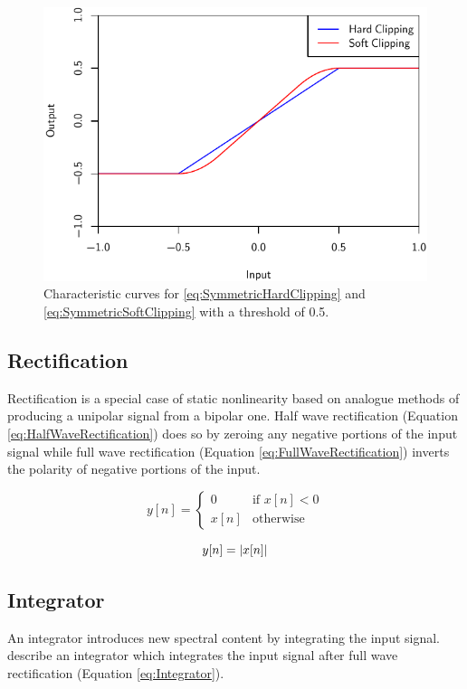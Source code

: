 		\begin{figure}[h!]
			\centering
			\includegraphics{chapter3/Images/Clipping.pdf}
			\caption{Characteristic curves for \ref{eq:SymmetricHardClipping} and
				 \ref{eq:SymmetricSoftClipping} with a threshold of 0.5.}
			\label{fig:Clipping}
		\end{figure}

	\subsection{Rectification}
	\label{sec:Excitation-Methods-Rectification}
		Rectification is a special case of static nonlinearity based on analogue methods of producing a unipolar
		signal from a bipolar one. Half wave rectification (Equation \ref{eq:HalfWaveRectification}) does so by
		zeroing any negative portions of the input signal while full wave rectification (Equation
		\ref{eq:FullWaveRectification}) inverts the polarity of negative portions of the input.

		\begin{equation}
			y[n] = \begin{cases}
				0 & \text{if $x[n] < 0$} \\
				x[n] & \text{otherwise}
			\end{cases}
			\label{eq:HalfWaveRectification}
		\end{equation}

		\begin{equation}
			y[n] = \left|x[n]\right|
			\label{eq:FullWaveRectification}
		\end{equation}

	\subsection{Integrator}
	\label{sec:Excitation-Methods-Integrator}
		An integrator introduces new spectral content by integrating the input signal. \citet{larsen2004audio}
		describe an integrator which integrates the input signal after full wave rectification (Equation
		\ref{eq:Integrator}).

